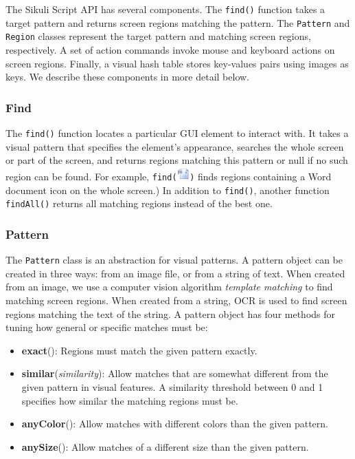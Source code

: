 \documentclass{chi2009}
\newcommand{\find}[1]{{\tt find({#1})}}
\newcommand{\findAll}[0]{{\tt findAll()}}
\newcommand{\Pattern}[0]{{\tt Pattern}}
\newcommand{\Region}[0]{{\tt Region}}
\begin{document}
The
Sikuli Script API has several components.  The \find{} function 
takes a target
pattern and returns screen regions matching the pattern.  The \Pattern{} and
\Region{} classes represent the target pattern and matching screen regions,
respectively.  A set of action commands invoke mouse and keyboard actions on
screen regions. Finally, a visual hash table stores key-values pairs using
images as keys. We describe these components in more detail below.

\subsubsection{Find}
The \find{} function locates a particular GUI element to interact with. 
It takes
a visual pattern that specifies the element’s appearance, searches the whole
screen or part of the screen, and returns regions matching this pattern or
null if no such region can be found. For example, 
\find{\includegraphics[height=0.2in]{figures/word.png}}
finds regions containing a Word document icon on the whole screen.)
In addition to \find{}, another function \findAll{} returns all matching
regions instead of the best one.

\subsubsection{Pattern}
The \Pattern{} class is an abstraction for visual patterns. A pattern object can
be created in three ways: from an image file, or
from a string of text. When created from an image, 
we use a computer vision algorithm {\it template matching}
to find matching screen regions.
When created from a string, OCR is used to find screen regions matching the
text of the string.  A pattern object has four methods for tuning how general
or specific matches must be:

\begin{itemize}
\item {\bf exact}(): Regions must match the given pattern exactly.
\item {\bf similar}({\it similarity}): Allow matches that are somewhat different from the
given pattern in visual features. A similarity threshold between 0 and 1
specifies how similar the matching regions must be.
\item {\bf anyColor}(): Allow matches with different colors than the given pattern.
\item {\bf anySize}():  Allow matches of a different size than the given pattern.
\end{itemize}
\end{document}
